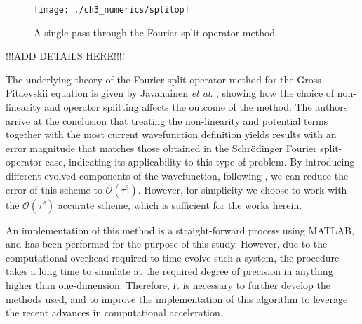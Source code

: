 \begin{figure}
    \centering
    \texttt{[image: ./ch3\_numerics/splitop]}
    \caption{A single pass through the Fourier split-operator method.}
    \label{fig:num_splitop}
\end{figure}

!!!ADD DETAILS HERE!!!!

The underlying theory of the Fourier split-operator method for the Gross--Pitaevskii equation is given by Javanainen \textit{et al}. \cite{BEC:Javanainen_jphysa_2006}, showing how the choice of non-linearity and operator splitting affects the outcome of the method. The authors arrive at the conclusion that treating the non-linearity and potential terms together with the most current wavefunction definition yields results with an error magnitude that matches those obtained in the Schr\"{o}dinger Fourier split-operator case, indicating its applicability to this type of problem. By introducing different evolved components of the wavefunction, following \cite{BEC:Javanainen_symbolic_calc_2006}, we can reduce the error of this scheme to $\mathcal{O}\left(\tau^3\right)$. However, for simplicity we choose to work with the $\mathcal{O}\left(\tau^2\right)$ accurate scheme, which is sufficient for the works herein.

An implementation of this method is a straight-forward process using MATLAB, and has been performed for the purpose of this study. However, due to the computational overhead required to time-evolve such a system, the procedure takes a long time to simulate at the required degree of precision in anything higher than one-dimension. Therefore, it is necessary to further develop the methods used, and to improve the implementation of this algorithm to leverage the recent advances in computational acceleration.

